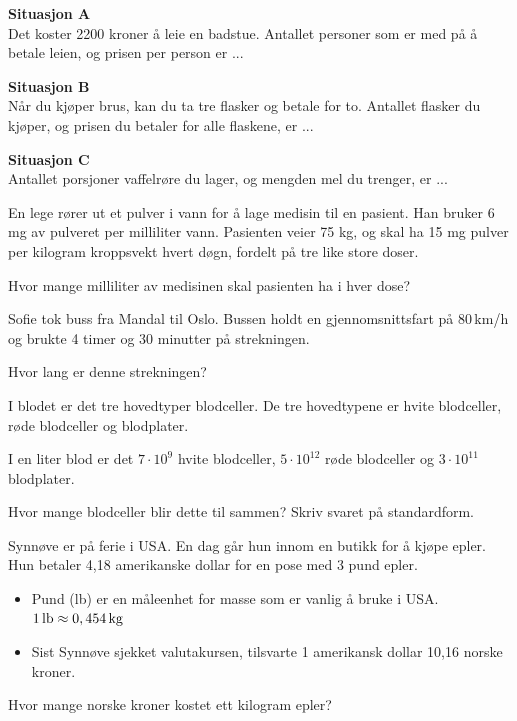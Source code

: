 \textbf{Situasjon A}\\
Det koster 2200 kroner å leie en badstue. Antallet personer som er med på å betale
leien, og prisen per person er ... \vsk

\textbf{Situasjon B}\\
Når du kjøper brus, kan du ta tre flasker og betale for to. Antallet flasker du kjøper, og
prisen du betaler for alle flaskene, er ... \vsk \vs

\textbf{Situasjon C}\\
Antallet porsjoner vaffelrøre du lager, og mengden mel du trenger, er ...


En lege rører ut et pulver i vann for å lage medisin til en pasient.
Han bruker 6 mg av pulveret per milliliter vann.
Pasienten veier 75 kg, og skal ha 15 mg pulver per kilogram kroppsvekt hvert døgn,
fordelt på tre like store doser. \os

Hvor mange milliliter av medisinen skal pasienten ha i hver dose?

Sofie tok buss fra Mandal til Oslo. Bussen holdt en gjennomsnittsfart
på 80\,km/h og brukte 4 timer og 30 minutter på strekningen. \os

Hvor lang er denne strekningen?

I blodet er det tre hovedtyper blodceller. De tre hovedtypene er hvite blodceller, røde
blodceller og blodplater. \os

I en liter blod er det $7\cdot10^9$ hvite blodceller, $5\cdot10^{12}$ røde blodceller og $3\cdot10^{11}$ blodplater. \os

Hvor mange blodceller blir dette til sammen? Skriv svaret på standardform.

Synnøve er på ferie i USA. En dag går hun innom en butikk for å kjøpe epler.
Hun betaler 4,18 amerikanske dollar for en pose med 3 pund epler.
\begin{itemize}
	\item Pund (lb) er en måleenhet for masse som er vanlig å bruke i USA.
	$1\,\text{lb} \approx 0,454\,\text{kg} $
	\item Sist Synnøve sjekket valutakursen, tilsvarte 1 amerikansk dollar
	10,16 norske kroner.
\end{itemize}
Hvor mange norske kroner kostet ett kilogram epler?






